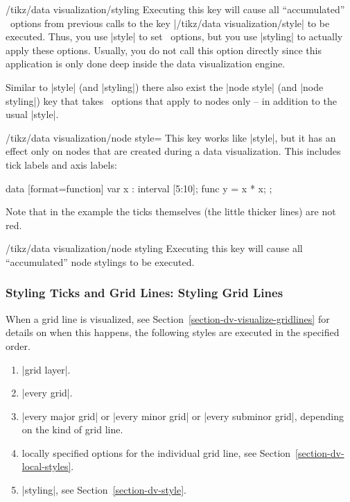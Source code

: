 \begin{key}{/tikz/data visualization/styling}
    Executing this key will cause all ``accumulated'' \tikzname\ options from previous calls to the key |/tikz/data visualization/style| to be executed. Thus, you use |style| to set \tikzname\ options, but you use |styling| to actually apply these options. Usually, you do not call this option directly since this application is only done deep inside the data visualization engine.
\end{key}

Similar to |style| (and |styling|) there also exist the |node style| (and
|node styling|) key that takes \tikzname\ options that apply to nodes only --
in addition to the usual |style|.

\begin{key}{/tikz/data visualization/node style=}
    This key works like |style|, but it has an effect only on nodes that are created during a data visualization. This includes tick labels and axis labels:
\begin{codeexample}[preamble={\usetikzlibrary{datavisualization.formats.functions}}]
\tikz \datavisualization
  [scientific axes,
   all axes={ticks={node style=red}, length=3cm},
   visualize as line]
  data [format=function] {
    var x : interval [5:10];
    func y = \value x * \value x;
  };
\end{codeexample}
    Note that in the example the ticks themselves (the little thicker lines)
    are not red.
\end{key}

\begin{key}{/tikz/data visualization/node styling}
    Executing this key will cause all ``accumulated'' node stylings to be
    executed.
\end{key}


\subsubsection{Styling Ticks and Grid Lines: Styling Grid Lines}
\label{section-dv-styling-grid-lines}

When a grid line is visualized, see Section~\ref{section-dv-visualize-gridlines} for details on when this happens, the following styles are executed in the specified order.
%
\begin{enumerate}
    \item |grid layer|.
    \item |every grid|.
    \item |every major grid| or |every minor grid| or |every subminor grid|, depending on the kind of grid line.
    \item locally specified options for the individual grid line, see Section~\ref{section-dv-local-styles}.
    \item |styling|, see Section~\ref{section-dv-style}.
\end{enumerate}

